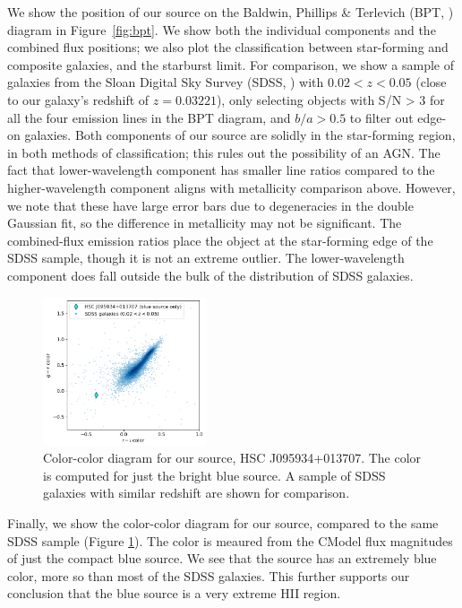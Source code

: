 We show the position of our source on the Baldwin, Phillips \& Terlevich (BPT, \citealt{Baldwin1981}) diagram in Figure~\ref{fig:bpt}.
We show both the individual components and the combined flux positions; we also plot the \cite{Kauffmann2003} classification between star-forming and composite galaxies, and the \cite{Kewley2001} starburst limit.
For comparison, we show a sample of galaxies from the Sloan Digital Sky Survey (SDSS, \citealt{York2000}) with $0.02<z<0.05$ (close to our galaxy's redshift of $z=0.03221$), only selecting objects with S/N > 3 for all the four emission lines in the BPT diagram, and $b/a > 0.5$ to filter out edge-on galaxies.
Both components of our source are solidly in the star-forming region, in both methods of classification; this rules out the possibility of an AGN.
The fact that lower-wavelength component has smaller line ratios compared to the higher-wavelength component aligns with metallicity comparison above.
However, we note that these have large error bars due to degeneracies in the double Gaussian fit, so the difference in metallicity may not be significant.
The combined-flux emission ratios place the object at the star-forming edge of the SDSS sample, though it is not an extreme outlier.
The lower-wavelength component does fall outside the bulk of the distribution of SDSS galaxies.

\begin{figure}
    \centering
    \includegraphics[width=0.43\textwidth]{color-color}
    \caption{Color-color diagram for our source, HSC J095934+013707. The color is computed for just the bright blue source. A sample of SDSS galaxies with similar redshift are shown for comparison.}
    \label{fig:color-color}
\end{figure}

Finally, we show the color-color diagram for our source, compared to the same SDSS sample (Figure \ref{fig:color-color}).
The color is meaured from the CModel flux magnitudes of just the compact blue source.
We see that the source has an extremely blue color, more so than most of the SDSS galaxies.
This further supports our conclusion that the blue source is a very extreme HII region.

